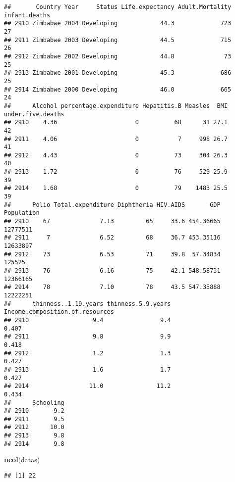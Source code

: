 \documentclass[
]{article}
\newenvironment{Shaded}{\begin{snugshade}}{\end{snugshade}}
\newcommand{\FunctionTok}[1]{\textcolor[rgb]{0.13,0.29,0.53}{\textbf{#1}}}
\newcommand{\NormalTok}[1]{#1}
\begin{document}
\begin{verbatim}
##       Country Year     Status Life.expectancy Adult.Mortality infant.deaths
## 2910 Zimbabwe 2004 Developing            44.3             723            27
## 2911 Zimbabwe 2003 Developing            44.5             715            26
## 2912 Zimbabwe 2002 Developing            44.8              73            25
## 2913 Zimbabwe 2001 Developing            45.3             686            25
## 2914 Zimbabwe 2000 Developing            46.0             665            24
##      Alcohol percentage.expenditure Hepatitis.B Measles  BMI under.five.deaths
## 2910    4.36                      0          68      31 27.1                42
## 2911    4.06                      0           7     998 26.7                41
## 2912    4.43                      0          73     304 26.3                40
## 2913    1.72                      0          76     529 25.9                39
## 2914    1.68                      0          79    1483 25.5                39
##      Polio Total.expenditure Diphtheria HIV.AIDS       GDP Population
## 2910    67              7.13         65     33.6 454.36665   12777511
## 2911     7              6.52         68     36.7 453.35116   12633897
## 2912    73              6.53         71     39.8  57.34834     125525
## 2913    76              6.16         75     42.1 548.58731   12366165
## 2914    78              7.10         78     43.5 547.35888   12222251
##      thinness..1.19.years thinness.5.9.years Income.composition.of.resources
## 2910                  9.4                9.4                           0.407
## 2911                  9.8                9.9                           0.418
## 2912                  1.2                1.3                           0.427
## 2913                  1.6                1.7                           0.427
## 2914                 11.0               11.2                           0.434
##      Schooling
## 2910       9.2
## 2911       9.5
## 2912      10.0
## 2913       9.8
## 2914       9.8
\end{verbatim}

\begin{Shaded}
\begin{Highlighting}[]
\FunctionTok{ncol}\NormalTok{(datas)}
\end{Highlighting}
\end{Shaded}

\begin{verbatim}
## [1] 22
\end{verbatim}
\end{document}
